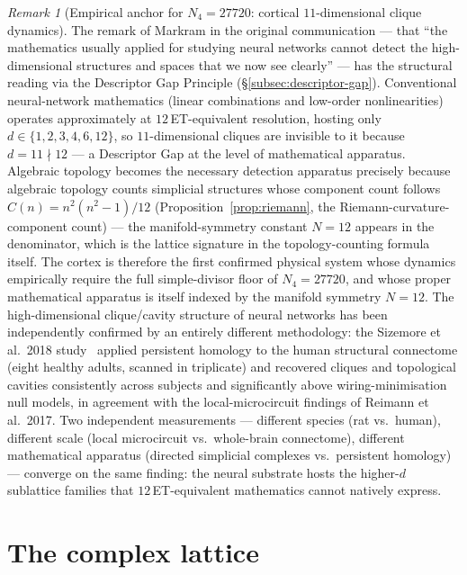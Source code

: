 \documentclass[11pt,a4paper]{article}
\theoremstyle{definition}
\theoremstyle{remark}
\newtheorem{remark}[theorem]{Remark}
\begin{document}
\begin{remark}[Empirical anchor for $N_{4}=27720$: cortical $11$-dimensional clique dynamics]
The remark of Markram in the original communication --- that ``the mathematics usually applied for studying neural networks cannot detect the high-dimensional structures and spaces that we now see clearly'' --- has the structural reading via the Descriptor Gap Principle (\S\ref{subsec:descriptor-gap}). Conventional neural-network mathematics (linear combinations and low-order nonlinearities) operates approximately at $12$\,ET-equivalent resolution, hosting only $d \in \{1,2,3,4,6,12\}$, so $11$-dimensional cliques are invisible to it because $d=11 \nmid 12$ --- a Descriptor Gap at the level of mathematical apparatus. Algebraic topology becomes the necessary detection apparatus precisely because algebraic topology counts simplicial structures whose component count follows $C(n) = n^{2}(n^{2}-1)/12$ (Proposition~\ref{prop:riemann}, the Riemann-curvature-component count) --- the manifold-symmetry constant $N=12$ appears in the denominator, which is the lattice signature in the topology-counting formula itself. The cortex is therefore the first confirmed physical system whose dynamics empirically require the full simple-divisor floor of $N_{4}=27720$, and whose proper mathematical apparatus is itself indexed by the manifold symmetry $N=12$. The high-dimensional clique/cavity structure of neural networks has been independently confirmed by an entirely different methodology: the Sizemore et al.\ 2018 study~\cite{Sizemore2018} applied persistent homology to the human structural connectome (eight healthy adults, scanned in triplicate) and recovered cliques and topological cavities consistently across subjects and significantly above wiring-minimisation null models, in agreement with the local-microcircuit findings of Reimann et al.\ 2017. Two independent measurements --- different species (rat vs.\ human), different scale (local microcircuit vs.\ whole-brain connectome), different mathematical apparatus (directed simplicial complexes vs.\ persistent homology) --- converge on the same finding: the neural substrate hosts the higher-$d$ sublattice families that $12$\,ET-equivalent mathematics cannot natively express.
\end{remark}

\section{The complex lattice}\label{sec:complex}
\end{document}
